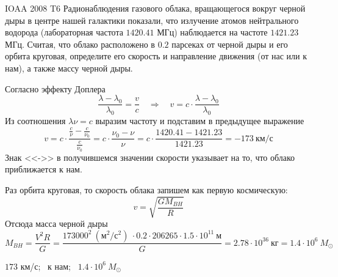 \begin{problem}{IOAA 2008 T6} 
	Радионаблюдения газового облака, вращающегося вокруг черной дыры в центре нашей галактики показали, что излучение атомов нейтрального водорода (лабораторная частота $1420.41$ МГц) наблюдается на частоте $1421.23$ МГц. Считая, что облако расположено в $0.2$ парсеках от черной дыры и его орбита круговая, определите его скорость и направление движения (от нас или к нам), а также массу черной дыры.

\begin{solution}
	Согласно эффекту Доплера
    \begin{equation}
        \frac{\lambda-\lambda_0}{\lambda_0}=\frac{v}{c} \quad\Longrightarrow\quad v=c\cdot\frac{\lambda-\lambda_0}{\lambda_0}
    \end{equation}
    Из соотношения $\lambda\nu=c$ выразим частоту и подставим в предыдущее выражение
    \begin{equation}
        v=c\cdot\frac{\frac{c}{\nu}-\frac{c}{\nu_0}}{\frac{c}{\nu_0}}=c\cdot\frac{\nu_0-\nu}{\nu}=c\cdot\frac{1420.41-1421.23}{1421.23}=-173~\text{км/с}
    \end{equation}
    Знак <<->> в получившемся значении скорости указывает на то, что облако приближается к нам.

    Раз орбита круговая, то скорость облака запишем как первую космическую:
    \begin{equation}
        v=\sqrt{\frac{GM_{BH}}{R}} 
    \end{equation}
    Отсюда масса черной дыры
    \begin{equation}
        M_{BH}=\frac{V^2R}{G}=\frac{173000^2~(\text{м$^2$/с$^2$})~\cdot 0.2\cdot 206265\cdot 1.5\cdot 10^{11}~\text{м}}{G}=2.78\cdot 10^{36}~\text{кг}=1.4\cdot 10^6~M_{\odot}
    \end{equation}

\end{solution}

\begin{answer*}
	$173$ км/с; \
    к нам; \
    $1.4\cdot 10^6~M_{\odot}$ 
\end{answer*}
\end{problem}